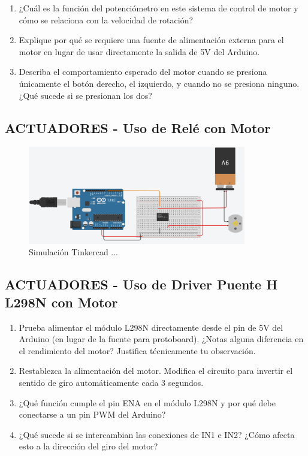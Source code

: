 \documentclass{article}
\begin{document}
\begin{enumerate}
    \item ¿Cuál es la función del potenciómetro en este sistema de control de motor y cómo se
    relaciona con la velocidad de rotación?
    \item Explique por qué se requiere una fuente de alimentación externa para el motor en lugar de usar directamente la salida de 5V del Arduino.
    \item Describa el comportamiento esperado del motor cuando se presiona únicamente el botón
    derecho, el izquierdo, y cuando no se presiona ninguno. ¿Qué sucede si se presionan los dos?
\end{enumerate}



\subsection{ACTUADORES - Uso de Relé con Motor}

\begin{figure}[H]
    \centering
    \includegraphics[width=0.85\textwidth]{./img/ckpt_rele_motor.png}
    \caption{Simulación Tinkercad ...}
    \label{fig:motor_driver}
\end{figure}


\subsection{ACTUADORES - Uso de Driver Puente H L298N con Motor}

\begin{enumerate}
    \item Prueba alimentar el módulo L298N directamente desde el pin de 5V del Arduino (en lugar de la fuente para protoboard). ¿Notas alguna diferencia en el rendimiento del motor? Justifica técnicamente tu observación.
    \item Restablezca la alimentación del motor. Modiﬁca el circuito para invertir el sentido de giro automáticamente cada 3 segundos.
    \item ¿Qué función cumple el pin ENA en el módulo L298N y por qué debe conectarse a un pin PWM del Arduino?
    \item ¿Qué sucede si se intercambian las conexiones de IN1 e IN2? ¿Cómo afecta esto a la dirección del giro del motor?
\end{enumerate}
\end{document}
